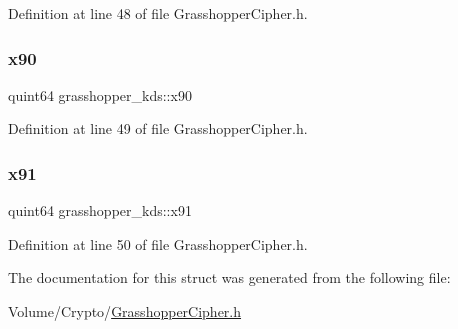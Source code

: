 Definition at line 48 of file Grasshopper\+Cipher.\+h.

\mbox{\label{structgrasshopper__kds_aa4c9c8d0b67a4e8ddceaa210ce6c3f9b}} 
\subsubsection{\texorpdfstring{x90}{x90}}
{\footnotesize\ttfamily quint64 grasshopper\+\_\+kds\+::x90}



Definition at line 49 of file Grasshopper\+Cipher.\+h.

\mbox{\label{structgrasshopper__kds_a0dfb862b74ed75fdc943f37751954522}} 
\subsubsection{\texorpdfstring{x91}{x91}}
{\footnotesize\ttfamily quint64 grasshopper\+\_\+kds\+::x91}



Definition at line 50 of file Grasshopper\+Cipher.\+h.



The documentation for this struct was generated from the following file\+:\begin{DoxyCompactItemize}
\item 
Volume/\+Crypto/\hyperlink{_grasshopper_cipher_8h}{Grasshopper\+Cipher.\+h}\end{DoxyCompactItemize}
